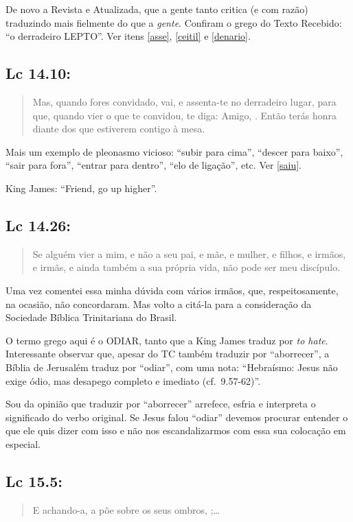 De novo a Revista e Atualizada, que a gente tanto critica (e com
razão) traduzindo mais fielmente do que a \emph{gente}. Confiram o
grego do Texto Recebido: ``o derradeiro LEPTO''. Ver itens \ref{asse}, \ref{ceitil} e \ref{denario}.


\subsection*{Lc 14.10:}
\begin{quote}
    \small
Mas, quando fores convidado, vai, e assenta-te no
derradeiro lugar, para que, quando vier o que te convidou, te diga:
Amigo, . Então terás honra diante dos que estiverem
contigo à mesa.
\end{quote}

Mais um exemplo de pleonasmo vicioso: ``subir para cima'', ``descer
para baixo'', ``sair para fora'', ``entrar para dentro'', ``elo de
ligação'', etc. Ver \ref{saiu}.

King James: ``Friend, go up higher''.


\subsection*{Lc 14.26:}

\begin{quote}
    \small
Se alguém vier a mim, e não  a seu pai,
e mãe, e mulher, e filhos, e irmãos, e irmãs, e ainda também a sua própria
vida, não pode ser meu discípulo.
\end{quote}

Uma vez comentei essa minha dúvida com vários irmãos, que,
respeitosamente, na ocasião, não concordaram. Mas volto a citá-la
para a consideração da Sociedade Bíblica Trinitariana do Brasil.

O termo grego aqui é o ODIAR, tanto que a King James traduz por
\textit{to hate}. Interessante observar que, apesar do TC também traduzir por
``aborrecer'', a Bíblia de Jerusalém traduz por ``odiar'', com uma
nota: ``Hebraísmo: Jesus não exige ódio, mas desapego completo e
imediato (cf.~9.57-62)''.

Sou da opinião que traduzir por ``aborrecer'' arrefece, esfria e interpreta o significado do verbo original. Se Jesus falou ``odiar'' devemos procurar entender o que ele quis dizer com isso e não nos escandalizarmos com essa sua colocação em especial.

\subsection*{Lc 15.5:}
\begin{quote}
    \small
E achando-a, a põe sobre os seus ombros, ;\ldots
\end{quote}

